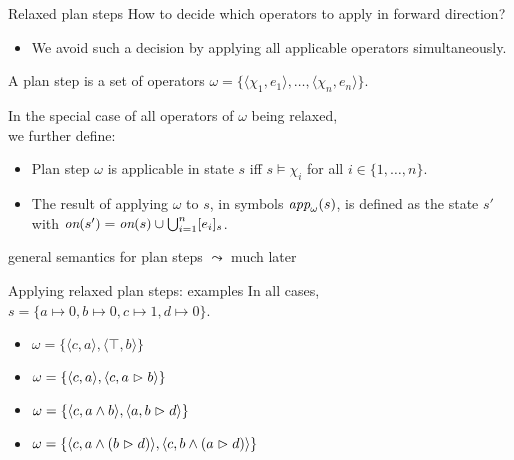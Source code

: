 \documentclass{gkibeamer}
\begin{document}
\begin{frame}{Relaxed plan steps}
  How to decide which operators to apply in forward direction?
  \begin{itemize}
  \item We \alert{avoid} such a decision by applying all applicable
    operators \alert{simultaneously}.
  \end{itemize}
  
  \begin{definition}
    A \alert{plan step} is a set of operators $\omega =
    \{\langle \chi_1, e_1\rangle, \dots, \langle \chi_n,
      e_n\rangle\}$.
      
    \smallskip
   
    In the \alert{special case of all operators of $\omega$ being
      relaxed}, \\
    we further define:
    \begin{itemize}
    \item Plan step $\omega$ is \alert{applicable} in state $s$ iff
      $s \models \chi_i$ for all $i \in \{1, \dots, n\}$.
    \item The \alert{result} of applying $\omega$ to $s$, in
      symbols $\textit{app}_{\omega}(s)$, is defined as the state $s'$ with
      $\textit{on}(s') = \textit{on}(s) \cup \bigcup_{i=1}^n \lbrack e_i\rbrack_{s}$.
    \end{itemize}
  \end{definition}
  \alert{general} semantics for plan steps $\leadsto$ much later
\end{frame}

\begin{frame}{Applying relaxed plan steps: examples}
  In all cases, $s = \{a \mapsto 0, b \mapsto 0, c \mapsto 1,
    d \mapsto 0\}$.
  \begin{itemize}
  \item $\omega = \{
    \langle c, a\rangle,
    \langle \top, b \rangle
    \}$
  \item $\omega = \{
    \langle c, a\rangle,
    \langle c, a \vartriangleright b \rangle
    \}$
  \item $\omega = \{
    \langle c, a \land b\rangle,
    \langle a, b \vartriangleright d\rangle
    \}$
  \item $\omega = \{
    \langle c, a \land (b \vartriangleright d)\rangle,
    \langle c, b \land (a \vartriangleright d)\rangle
    \}$
  \end{itemize}
\end{frame}
\end{document}

